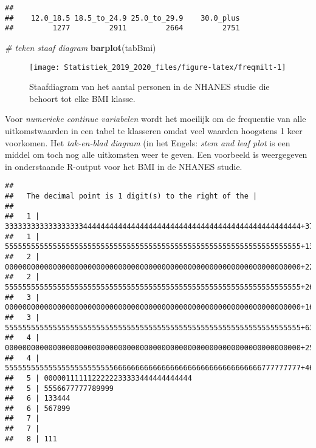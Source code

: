 \documentclass[12pt,dutch,coursenotes]{book}
\newenvironment{Shaded}{\begin{snugshade}}{\end{snugshade}}
\newcommand{\KeywordTok}[1]{\textcolor[rgb]{0.13,0.29,0.53}{\textbf{#1}}}
\newcommand{\StringTok}[1]{\textcolor[rgb]{0.31,0.60,0.02}{#1}}
\newcommand{\CommentTok}[1]{\textcolor[rgb]{0.56,0.35,0.01}{\textit{#1}}}
\newcommand{\OperatorTok}[1]{\textcolor[rgb]{0.81,0.36,0.00}{\textbf{#1}}}
\newcommand{\NormalTok}[1]{#1}
\theoremstyle{definition}
\theoremstyle{definition}
\theoremstyle{definition}
\theoremstyle{remark}
\begin{document}
\begin{Shaded}
\end{Shaded}

\begin{verbatim}
## 
##    12.0_18.5 18.5_to_24.9 25.0_to_29.9    30.0_plus 
##         1277         2911         2664         2751
\end{verbatim}

\begin{Shaded}
\begin{Highlighting}[]
\CommentTok{# teken staaf diagram}
\KeywordTok{barplot}\NormalTok{(tabBmi)}
\end{Highlighting}
\end{Shaded}

\begin{figure}

{\centering \texttt{[image: Statistiek\_2019\_2020\_files/figure-latex/freqmilt-1]} 

}

\caption{Staafdiagram van het aantal personen in de NHANES studie die behoort tot elke BMI klasse.}\label{fig:freqmilt}
\end{figure}

Voor \emph{numerieke continue variabelen} wordt het moeilijk om de
frequentie van alle uitkomstwaarden in een tabel te klasseren omdat veel
waarden hoogstens 1 keer voorkomen. Het \emph{tak-en-blad diagram} (in
het Engels: \emph{stem and leaf plot} is een middel om toch nog alle
uitkomsten weer te geven. Een voorbeeld is weergegeven in onderstaande
R-output voor het BMI in de NHANES studie.

\begin{Shaded}
\end{Shaded}

\begin{verbatim}
## 
##   The decimal point is 1 digit(s) to the right of the |
## 
##   1 | 33333333333333333344444444444444444444444444444444444444444444444444+37
##   1 | 55555555555555555555555555555555555555555555555555555555555555555555+1389
##   2 | 00000000000000000000000000000000000000000000000000000000000000000000+2264
##   2 | 55555555555555555555555555555555555555555555555555555555555555555555+2610
##   3 | 00000000000000000000000000000000000000000000000000000000000000000000+1693
##   3 | 55555555555555555555555555555555555555555555555555555555555555555555+635
##   4 | 00000000000000000000000000000000000000000000000000000000000000000000+255
##   4 | 55555555555555555555555556666666666666666666666666666666666777777777+46
##   5 | 0000011111122222233333444444444444
##   5 | 5556677777789999
##   6 | 133444
##   6 | 567899
##   7 | 
##   7 | 
##   8 | 111
\end{verbatim}
\end{document}
